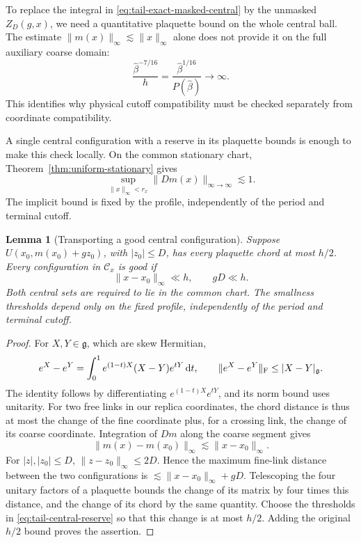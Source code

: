 \documentclass[11pt,reqno]{amsart}
\numberwithin{equation}{section}
\newtheorem{lemma}[theorem]{Lemma}
\theoremstyle{definition}
\theoremstyle{remark}
\newcommand{\dd}{\mathrm d}
\newcommand{\g}{\mathfrak g}
\begin{document}
To replace the integral in
\eqref{eq:tail-exact-masked-central} by the unmasked
\(Z_D(g,x)\), we need a quantitative plaquette bound on
the whole central ball. The estimate
\(\|m(x)\|_\infty\lesssim\|x\|_\infty\) alone
does not provide it on the full auxiliary coarse domain:
\begin{equation}
       \frac{\widehat\beta^{-7/16}}h
                 =\frac{\widehat\beta^{1/16}}{P(\widehat\beta)}
                         \longrightarrow\infty.
 \label{eq:tail-two-coarse-widths}
\end{equation}
This identifies why physical cutoff compatibility must
be checked separately from coordinate compatibility.

A single central configuration with a reserve in its
plaquette bounds is enough to make this check locally.
On the common stationary chart,
Theorem~\ref{thm:uniform-stationary} gives
\[
       \sup_{\|x\|_\infty<r_x}
              \|Dm(x)\|_{\infty\to\infty}\lesssim1.
\]
The implicit bound is fixed by the profile, independently
of the period and terminal cutoff.

\begin{lemma}[Transporting a good central configuration]
\label{lem:tail-central-reserve}
Suppose \(U(x_0,m(x_0)+gz_0)\), with \(|z_0|\le D\),
has every plaquette chord at most \(h/2\).
Every configuration in \(\mathcal C_x\) is good if
\begin{equation}
       \|x-x_0\|_\infty\ll h,\qquad gD\ll h.
 \label{eq:tail-central-reserve}
\end{equation}
Both central sets are required to lie in the common chart.
The smallness thresholds depend only on the fixed profile,
independently of the period and terminal cutoff.
\end{lemma}
\begin{proof}
For \(X,Y\in\g\), which are skew Hermitian,
\[
       e^X-e^Y=\int_0^1e^{(1-t)X}(X-Y)e^{tY}\,\dd t,
       \qquad \|e^X-e^Y\|_{\rm F}\le|X-Y|_{\g}.
\]
The identity follows by differentiating
\(e^{(1-t)X}e^{tY}\), and its norm bound uses unitarity.
For two free links in our replica coordinates, the chord
distance is thus at most the change of the fine coordinate
plus, for a crossing link, the change of its coarse coordinate.
Integration of \(Dm\) along the coarse segment gives
\[
       \|m(x)-m(x_0)\|_\infty
                              \lesssim\|x-x_0\|_\infty.
\]
For \(|z|,|z_0|\le D\),
\(\|z-z_0\|_\infty\le2D\). Hence the maximum fine-link
distance between the two configurations is
\(\lesssim\|x-x_0\|_\infty+gD\).
Telescoping the four unitary factors of a plaquette
bounds the change of its matrix by four times this
distance, and the change of its chord by the same quantity.
Choose the thresholds in \eqref{eq:tail-central-reserve}
so that this change is at most \(h/2\). Adding the original
\(h/2\) bound proves the assertion.
\end{proof}
\end{document}
